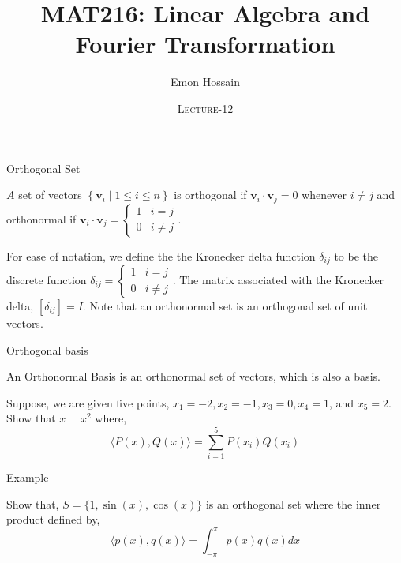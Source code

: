 \documentclass[11pt]{beamer}
\author[] %
{Emon Hossain\inst{1}}
\institute[University of Dhaka] %
{
  \inst{1}%
  Lecturer\\MNS department\\Brac University
}
\date[] %
{\textsc{Lecture-12}}
\title[]{MAT216: Linear Algebra and Fourier Transformation}
\theoremstyle{plain}
\begin{document}
\begin{frame}
\titlepage
\end{frame}

\begin{frame}{Orthogonal Set}
    \begin{definition}
        $A$ set of vectors $\left\{\mathbf{v}_i \mid 1 \leq i \leq n\right\}$ is orthogonal if $\mathbf{v}_i \cdot \mathbf{v}_j=0$ whenever $i \neq j$ and orthonormal if $\mathbf{v}_i \cdot \mathbf{v}_j= \begin{cases}1 & i=j \\ 0 & i \neq j\end{cases}$.
    \end{definition}
    For ease of notation, we define the the Kronecker delta function $\delta_{i j}$ to be the discrete function $\delta_{i j}=\left\{\begin{array}{ll}1 & i=j \\ 0 & i \neq j\end{array}\right.$. The matrix associated with the Kronecker delta, $\left[\delta_{i j}\right]=I$.
Note that an orthonormal set is an orthogonal set of unit vectors.
\end{frame}

\begin{frame}{Orthogonal basis}
    \begin{definition}
        An Orthonormal Basis is an orthonormal set of vectors, which is also a basis.
    \end{definition}
    \begin{example}
        Suppose, we are given five points, $x_1=-2,x_2=-1,x_3=0,x_4=1$, and $x_5=2$. Show that $x\perp x^2$ where, 
        $$\langle P(x),Q(x) \rangle=\sum_{i=1}^5 P(x_i)Q(x_i)$$
    \end{example}
\end{frame}

\begin{frame}{Example}
    \begin{example}
        Show that, $S=\{1,\sin(x),\cos(x)\}$ is an orthogonal set where the inner product defined by,
        $$\langle p(x),q(x) \rangle=\int_{-\pi}^\pi p(x)q(x)dx$$
    \end{example}
\end{frame}
\end{document}
